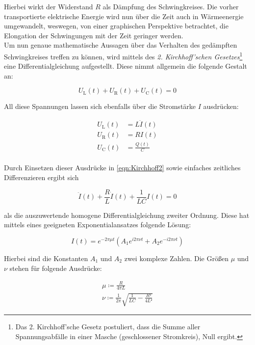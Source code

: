 \noindent Hierbei wirkt der Widerstand $R$ als Dämpfung des Schwingkreises. Die vorher transportierte elektrische Energie wird nun 
über die Zeit auch in Wärmeenergie umgewandelt, weswegen, von einer graphischen Perspektive betrachtet, die Elongation der 
Schwingungen mit der Zeit geringer werden.\\
Um nun genaue mathematische Aussagen über das Verhalten des gedämpften Schwingkreises treffen zu können, wird mittels des 
\emph{2. Kirchhoff'schen Gesetzes}\footnote{Das 2. Kirchhoff'sche Gesetz postuliert, dass die Summe aller Spannungsabfälle
in einer Masche (geschlossener Stromkreis), Null ergibt.} eine Differentialgleichung aufgestellt. Diese nimmt 
allgemein die folgende Gestalt an:

\begin{equation}
\label{eqn:Kirchhoff2}
    U_\text{L}(t) + U_\text{R}(t) + U_\text{C}(t) = 0
\end{equation}

\noindent All diese Spannungen lassen sich ebenfalls über die Stromstärke $I$ ausdrücken:

\begin{align*}
    U_\text{L}(t) &= L\dot{I}(t) \\
    U_\text{R}(t) &= RI(t) \\
    U_\text{C}(t) &= \frac{Q(t)}{C} \\
\end{align*}

\noindent Durch Einsetzen dieser Ausdrücke in \eqref{eqn:Kirchhoff2} sowie einfaches zeitliches Differenzieren ergibt sich

\begin{equation*}
    \ddot{I}(t) + \frac{R}{L}\dot{I}(t) + \frac{1}{LC}I(t) = 0
\end{equation*}

\noindent als die auszuwertende homogene Differentialgleichung zweiter Ordnung. Diese hat mittels eines geeigneten Exponentialansatzes 
folgende Lösung:

\begin{equation}
\label{eqn:solutionDGL}
    I(t) = e^{-2\pi\mu{}t}\left(A_1e^{i2\pi\nu{}t} + A_2e^{-i2\pi\nu{}t}\right)
\end{equation}

\noindent Hierbei sind die Konstanten $A_1$ und $A_2$ zwei komplexe Zahlen. Die Größen $\mu$ und $\nu$ stehen 
für folgende Ausdrücke:

\begin{gather*}
    \mu \coloneqq \frac{R}{4\pi{}L} 
    \label{eqn:mu}\\
    \nu \coloneqq \frac{1}{2\pi}\sqrt{\frac{1}{LC} - \frac{R²}{4L²}}
\end{gather*}
